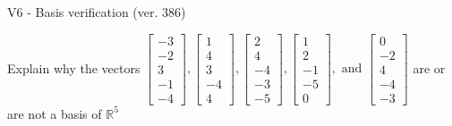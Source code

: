 \begin{exercise}
  \begin{exerciseTitle}V6 - Basis verification (ver. 386)\end{exerciseTitle}
  \begin{exerciseStatement}
    Explain why the vectors \(\left[\begin{array}{r}
-3 \\
-2 \\
3 \\
-1 \\
-4
\end{array}\right] , \left[\begin{array}{r}
1 \\
4 \\
3 \\
-4 \\
4
\end{array}\right] , \left[\begin{array}{r}
2 \\
4 \\
-4 \\
-3 \\
-5
\end{array}\right] , \left[\begin{array}{r}
1 \\
2 \\
-1 \\
-5 \\
0
\end{array}\right] , \text{ and } \left[\begin{array}{r}
0 \\
-2 \\
4 \\
-4 \\
-3
\end{array}\right]\) are or are not a basis of \(\mathbb{R}^5\)	



\end{exerciseStatement}
\end{exercise}
